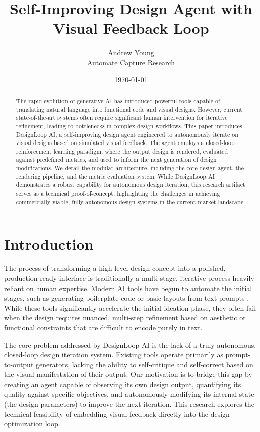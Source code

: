 \documentclass[11pt,a4paper]{article}
\title{Self-Improving Design Agent with Visual Feedback Loop}
\author{Andrew Young \\ Automate Capture Research}
\date{\today}
\begin{document}
\maketitle

\begin{abstract}
The rapid evolution of generative AI has introduced powerful tools capable of translating natural language into functional code and visual designs. However, current state-of-the-art systems often require significant human intervention for iterative refinement, leading to bottlenecks in complex design workflows. This paper introduces DesignLoop AI, a self-improving design agent engineered to autonomously iterate on visual designs based on simulated visual feedback. The agent employs a closed-loop reinforcement learning paradigm, where the output design is rendered, evaluated against predefined metrics, and used to inform the next generation of design modifications. We detail the modular architecture, including the core design agent, the rendering pipeline, and the metric evaluation system. While DesignLoop AI demonstrates a robust capability for autonomous design iteration, this research artifact serves as a technical proof-of-concept, highlighting the challenges in achieving commercially viable, fully autonomous design systems in the current market landscape.
\end{abstract}

\section{Introduction}
The process of transforming a high-level design concept into a polished, production-ready interface is traditionally a multi-stage, iterative process heavily reliant on human expertise. Modern AI tools have begun to automate the initial stages, such as generating boilerplate code or basic layouts from text prompts \cite{openai2023}. While these tools significantly accelerate the initial ideation phase, they often fail when the design requires nuanced, multi-step refinement based on aesthetic or functional constraints that are difficult to encode purely in text.

The core problem addressed by DesignLoop AI is the lack of a truly autonomous, closed-loop design iteration system. Existing tools operate primarily as prompt-to-output generators, lacking the ability to self-critique and self-correct based on the visual manifestation of their output. Our motivation is to bridge this gap by creating an agent capable of observing its own design output, quantifying its quality against specific objectives, and autonomously modifying its internal state (the design parameters) to improve the next iteration. This research explores the technical feasibility of embedding visual feedback directly into the design optimization loop.
\end{document}
